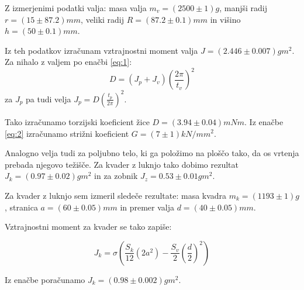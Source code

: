 \documentclass[12pt]{report}
\begin{document}
Z izmerjenimi podatki valja: masa valja $m_v = (2500 \pm 1)g$, manjši radij $r = (15 \pm 87.2)mm$, veliki radij $R = (87.2 \pm 0.1)mm$ in višino $h = (50 \pm 0.1)mm$. 

Iz teh podatkov izračunam vztrajnostni moment valja $J = (2.446 \pm 0.007)gm^2$. Za nihalo z valjem po enačbi \ref{eq:1}: 
\begin{equation}
  D = (J_p + J_v)\left(\frac{2\pi}{t_v}\right)^2
\end{equation}
za $J_p$ pa tudi velja $J_p = D (\frac{t_p}{2\pi})^2$. 

Tako izračunamo torzijski koeficient žice $D = (3.94 \pm 0.04)mNm$. Iz enačbe \ref{eq:2} izračunamo strižni koeficient $G = (7 \pm 1)kN/mm^2$. 

Analogno velja tudi za poljubno telo, ki ga položimo na ploščo tako, da os vrtenja prebada njegovo težišče. Za kvader z luknjo tako dobimo rezultat $J_k = (0.97 \pm 0.02)gm^2$ in za zobnik $J_z = 0.53 \pm 0.01gm^2$. 

Za kvader z luknjo sem izmeril sledeče rezultate: masa kvadra $m_k = (1193\pm1)g$, stranica $a = (60 \pm 0.05)mm$ in premer valja $d = (40 \pm 0.05)mm$. 

Vztrajnostni moment za kvader se tako zapiše: 

\begin{equation}
  J_k = \sigma\left(\frac{S_k}{12}(2a^2) - \frac{S_v}{2}\left(\frac{d}{2}\right)^2\right)
\end{equation}

Iz enačbe poračunamo $J_k = (0.98 \pm 0.002)gm^2$. 
\end{document}
